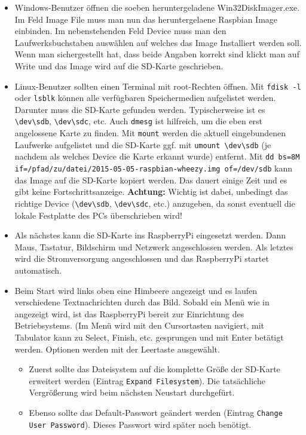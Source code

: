 \begin{itemize}
{		}
	\item {Windows-Benutzer öffnen die soeben heruntergeladene Win32DiskImager.exe. Im Feld Image File muss man nun das heruntergelaene Raspbian Image einbinden. 
		Im nebenstehenden Feld Device muss man den Laufwerksbuchstaben auswählen auf welches das Image Installiert werden soll. 
		Wenn man sichergestellt hat, dass beide Angaben korrekt sind klickt man auf Write und das Image wird auf die SD-Karte geschrieben.
		}
	\item {Linux-Benutzer sollten einen Terminal mit root-Rechten öffnen. 
		Mit \lstinline|fdisk -l| oder \lstinline|lsblk| können alle verfügbaren Speichermedien aufgelistet werden. Darunter muss die SD-Karte gefunden werden.
		Typischerweise ist es \lstinline|\dev\sdb|, \lstinline|\dev\sdc|, etc.
		Auch \lstinline|dmesg| ist hilfreich, um die eben erst angelossene Karte zu finden. 
		Mit \lstinline|mount| werden die aktuell eingebundenen Laufwerke aufgelistet und 
		die SD-Karte ggf. mit \lstinline|umount \dev\sdb| (je nachdem als welches Device die Karte erkannt wurde) entfernt.
		Mit \lstinline|dd bs=8M if=/pfad/zu/datei/2015-05-05-raspbian-wheezy.img of=/dev/sdb| kann das Image auf die SD-Karte kopiert werden.
		Das dauert einige Zeit und es gibt keine Fortschrittsanzeige.
		\textbf{Achtung:} Wichtig ist dabei, unbedingt das richtige Device (\lstinline|\dev\sdb|, \lstinline|\dev\sdc|, etc.) anzugeben, 
		da sonst eventuell die lokale Festplatte des PCs überschrieben wird!
		}
	\item {Als nächstes kann die SD-Karte ins RaspberryPi eingesetzt werden. Dann Maus, Tastatur, Bildschirm und Netzwerk angeschlossen werden. 
		Als letztes wird die Stromversorgung angeschlossen und das RaspberryPi startet automatisch.
		}
	\item {Beim Start wird links oben eine Himbeere angezeigt und es laufen verschiedene Textnachrichten durch das Bild. 
		Sobald ein Menü wie in  angezeigt wird, ist das RaspberryPi bereit zur Einrichtung des Betriebsystems. 
		(Im Menü wird mit den Cursortasten navigiert, mit Tabulator kann zu Select, Finish, etc. gesprungen und mit Enter betätigt werden. Optionen werden mit der Leertaste ausgewählt.
		\begin{itemize}
		\item {Zuerst sollte das Dateisystem auf die komplette Größe der SD-Karte erweitert werden
			(Eintrag \lstinline|Expand Filesystem|). Die tatsächliche Vergrößerung wird beim nächsten Neustart durchgefürt.}
		\item {Ebenso sollte das Default-Passwort geändert werden (Eintrag \lstinline|Change User Password|). Dieses Passwort wird später noch benötigt.
}
\end{itemize}}
\end{itemize}
